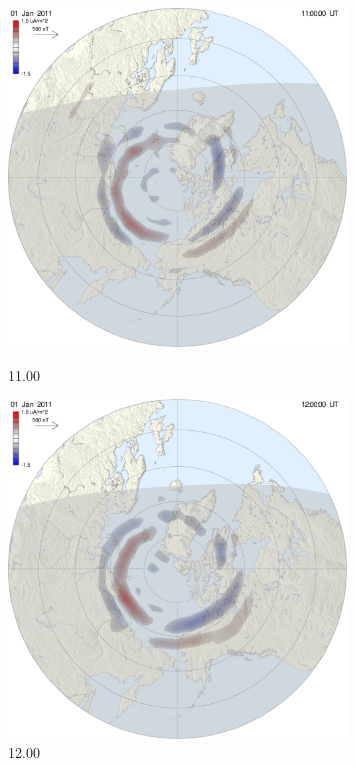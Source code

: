 \begin{figure}[ht!]

\begin{minipage}{0.33\textwidth}
\includegraphics[width=0.8\textwidth]{Figures/Ampere/1293879600at1100north.pdf}
\caption{11.00}
\end{minipage}
\begin{minipage}{0.33\textwidth}
\includegraphics[width=0.8\textwidth]{Figures/Ampere/1293883200at1200north.pdf}
\caption{12.00}
\end{minipage}
\begin{minipage}{0.33\textwidth}

\end{minipage}
\end{figure}
